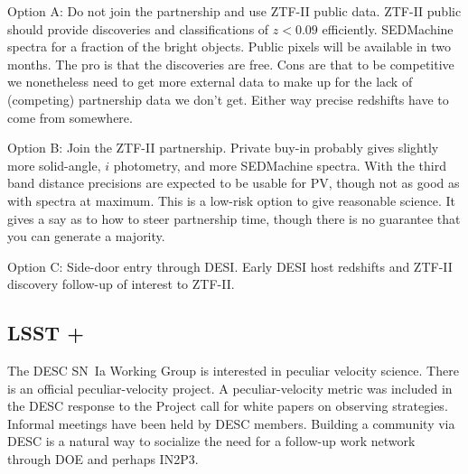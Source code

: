 Option A: Do not join the partnership and use ZTF-II public data.
ZTF-II public should provide discoveries and classifications of $z<0.09$ efficiently.  SEDMachine spectra for a
fraction of the bright objects.  Public pixels will be available in two months.
The pro is that the discoveries are free.
Cons are  that to be competitive we nonetheless need to get more external data to make up for the lack of (competing) partnership data
we don't get.  
Either way precise redshifts have to come from somewhere.


Option B: Join the ZTF-II partnership.
Private buy-in probably gives slightly more solid-angle, $i$ photometry, and more SEDMachine spectra.  With the third band distance precisions are expected
to be usable for PV, though not as good as with spectra at maximum.  This is a low-risk option to give reasonable science.
It gives a say as to how to steer partnership time, though there is no guarantee that
you can generate a majority.

Option C: Side-door entry through DESI.  Early DESI host redshifts and ZTF-II discovery follow-up of interest to ZTF-II.

\subsection{LSST +}
The DESC SN~Ia Working Group is interested in peculiar velocity science.  There is an official peculiar-velocity project.  A peculiar-velocity
metric was included in the DESC response to the Project call for white papers on observing strategies.
Informal meetings have been held by DESC members.
Building a community via DESC is a natural way to socialize the need for a follow-up work network through DOE and perhaps
IN2P3.

\begin{comment}
\subsection{A New Project}
The scope of ZTF2 and the coordination of follow-up of LSST discoveries extend beyond the confines
of current DOE projects.  The recommendations
of the  Small Projects Portfolio  by the  Cosmic Visions Dark Energy Working Group
provides an path by which LBL could lead an international collaboration,
supported by the Office of Science, in the study of Peculiar Velocities.

The new peculiar velocity project would focus on two topics: the use of DESI (and future spectroscopic surveys
such as DESI2) for measuring distances of
fundamental plane galaxies; the mobilization of follow-up resources and data management that are required or enhance 
the probative power of transient discoveries by ZTF2/LSST.  Ideas being discussed for the latter include
refurbishment and use of the
UH-88 + SNIFS, DESI, 4MOST, a proposed French spectrograph mounted at ESO,
a network of identical spectrographs (e.g.\ the DESI design) distributed around the world.
There is expressed interest from South Africa and Australia in using their resources for peculiar-velocity follow-up observations.
\end{comment}

